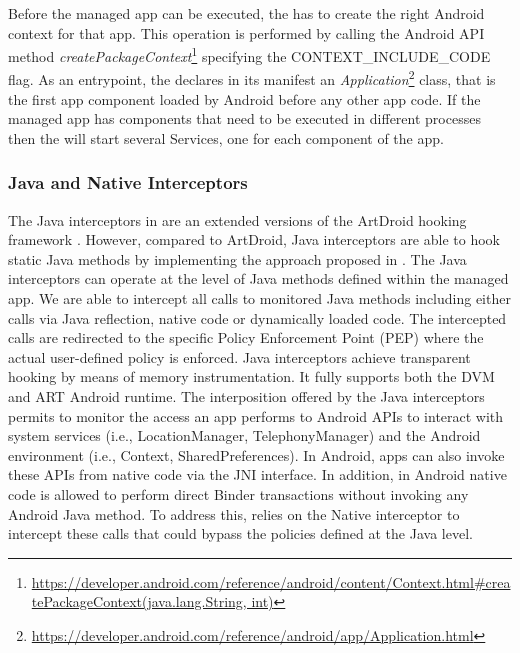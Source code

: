 Before the managed app can be executed, the \stub has to create the right Android context for that app. This operation is performed by calling the Android API method \textit{createPackageContext}\footnote{\url{https://developer.android.com/reference/android/content/Context.html\#createPackageContext(java.lang.String, int)}} specifying  the CONTEXT\_INCLUDE\_CODE flag. 
As an entrypoint, the \stub declares in its manifest an \textit{Application}\footnote{\url{https://developer.android.com/reference/android/app/Application.html}} class, that is the first app component loaded by Android before any other app code. 
If the managed app has components that need to be executed in different processes then the \stub will start several \asd Services, one for each component of the app. 


\subsubsection{Java and Native Interceptors} \label{sec:hook}
The Java interceptors in \asd are an extended versions of the ArtDroid  hooking framework \cite{costamagna2016artdroid}. However, compared to ArtDroid, \asd Java interceptors are able to hook static Java methods by implementing the approach proposed in \cite{wissfeldcallee}. 
The Java interceptors can operate at the level of Java methods defined within the managed app. We are able to intercept all calls to monitored Java methods including either calls via Java reflection, native code or dynamically loaded code. The intercepted calls are redirected to the specific Policy Enforcement Point (PEP) where the actual user-defined policy is enforced. Java interceptors achieve transparent hooking by means of memory instrumentation. It  fully supports both the DVM and ART Android runtime. The interposition offered by the Java interceptors permits to monitor the access an app performs to  Android APIs to interact with system services (i.e., LocationManager, TelephonyManager) and the Android environment (i.e., Context, SharedPreferences). In Android, apps can also  invoke these APIs from native code via the JNI interface. In addition, in Android native code is allowed to perform direct Binder transactions without invoking any Android Java method. To address this, \asd relies on the Native interceptor to intercept these calls that could bypass the policies defined at the Java level.

